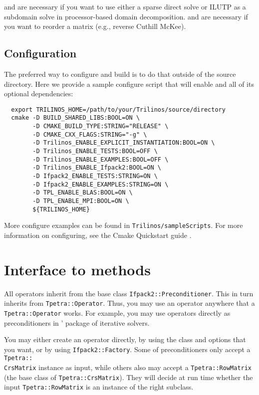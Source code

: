 \amesostwo and \superlu are necessary if you want to use either a sparse direct
solve or ILUTP as a subdomain solve in processor-based domain decomposition.
\zoltantwo and \xpetra are necessary if you want to reorder a matrix (e.g.,
reverse Cuthill McKee).

\subsection{Configuration}
The preferred way to configure and build \ifpacktwo{} is to do that outside of the source directory.
Here we provide a sample configure script that will enable \ifpacktwo{} and all of its optional dependencies:
\begin{lstlisting}
  export TRILINOS_HOME=/path/to/your/Trilinos/source/directory
  cmake -D BUILD_SHARED_LIBS:BOOL=ON \
        -D CMAKE_BUILD_TYPE:STRING="RELEASE" \
        -D CMAKE_CXX_FLAGS:STRING="-g" \
        -D Trilinos_ENABLE_EXPLICIT_INSTANTIATION:BOOL=ON \
        -D Trilinos_ENABLE_TESTS:BOOL=OFF \
        -D Trilinos_ENABLE_EXAMPLES:BOOL=OFF \
        -D Trilinos_ENABLE_Ifpack2:BOOL=ON \
        -D Ifpack2_ENABLE_TESTS:STRING=ON \
        -D Ifpack2_ENABLE_EXAMPLES:STRING=ON \
        -D TPL_ENABLE_BLAS:BOOL=ON \
        -D TPL_ENABLE_MPI:BOOL=ON \
        ${TRILINOS_HOME}
\end{lstlisting}

\noindent
More configure examples can be found in \texttt{Trilinos/sampleScripts}.
For more information on configuring, see the \trilinos Cmake Quickstart guide \cite{TrilinosCmakeQuickStart}.

\section{Interface to \ifpacktwo{} methods}
All \ifpacktwo operators inherit from the base class
\texttt{Ifpack2::Preconditioner}. This in turn inherits from
\texttt{Tpetra::Operator}. Thus, you may use an \ifpacktwo operator anywhere
that a \texttt{Tpetra::Operator} works. For example, you may use \ifpacktwo operators
directly as preconditioners in \trilinos' \belos package of iterative solvers.

You may either create an \ifpacktwo operator directly, by using the class and
options that you want, or by using \texttt{Ifpack2::Factory}. Some of
\ifpacktwo preconditioners only accept a \texttt{Tpetra::\\CrsMatrix} instance as
input, while others also may accept a \texttt{Tpetra::RowMatrix} (the base class
of \texttt{Tpetra::CrsMatrix}). They will decide at run time whether the input
\texttt{Tpetra::RowMatrix} is an instance of the right subclass.

